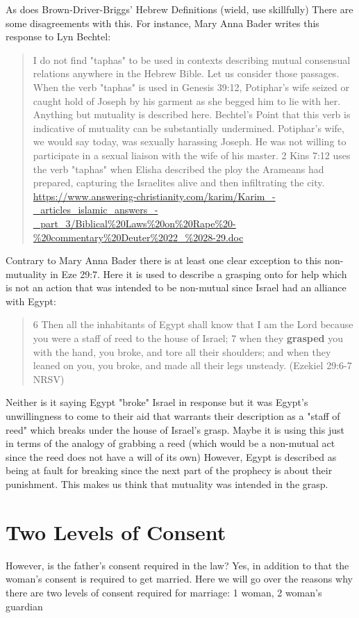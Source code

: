 \documentclass[11pt]{article}
\begin{document}
As does Brown-Driver-Briggs' Hebrew Definitions (wield, use skillfully) There are some disagreements with this. For instance, Mary Anna Bader writes this response to Lyn Bechtel:

\begin{quote}
I do not find "taphas" to be used in contexts describing mutual consensual relations anywhere in the Hebrew Bible. Let us consider those passages. When the verb "taphas" is used in Genesis 39:12, Potiphar's wife seized or caught hold of Joseph by his garment as she begged him to lie with her. Anything but mutuality is described here. Bechtel's Point that this verb is indicative of mutuality can be substantially undermined. Potiphar's wife, we would say today, was sexually harassing Joseph. He was not willing to participate in a sexual liaison with the wife of his master. 2 Kins 7:12 uses the verb "taphas" when Elisha described the ploy the Arameans had prepared, capturing the Israelites alive and then infiltrating the city. 
\url{https://www.answering-christianity.com/karim/Karim_-_articles_islamic_answers_-_part_3/Biblical\%20Laws\%20on\%20Rape\%20-\%20commentary\%20Deuter\%2022_\%2028-29.doc}
\end{quote}

Contrary to Mary Anna Bader there is at least one clear exception to this non-mutuality in Eze 29:7. Here it is used to describe a grasping onto for help which is not an action that was intended to be non-mutual since Israel had an alliance with Egypt:
\begin{quote}
6 Then all the inhabitants of Egypt shall know
    that I am the Lord
because you were a staff of reed
    to the house of Israel;
7 when they \textbf{grasped} you with the hand, you broke,
    and tore all their shoulders;
and when they leaned on you, you broke,
    and made all their legs unsteady.
    (Ezekiel 29:6-7 NRSV)
\end{quote}
Neither is it saying Egypt "broke" Israel in response but it was Egypt's unwillingness to come to their aid that warrants their description as a "staff of reed" which breaks under the house of Israel's grasp. Maybe it is using this just in terms of the analogy of grabbing a reed (which would be a non-mutual act since the reed does not have a will of its own) However, Egypt is described as being at fault for breaking since the next part of the prophecy is about their punishment. This makes us think that mutuality was intended in the grasp.

\section{Two Levels of Consent}
However, is the father's consent required in the law? Yes, in addition to that the woman's consent is required to get married. Here we will go over the reasons why there are two levels of consent required for marriage: 1 woman, 2 woman’s guardian
\end{document}
